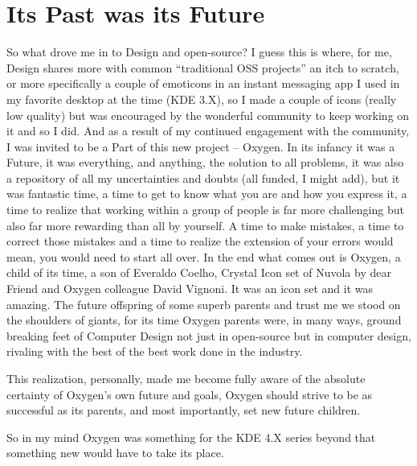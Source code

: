 {\section*{Its Past was its Future}
So what drove me in to Design and open-source? 
I guess this is where, for me, Design shares more with common “traditional OSS projects” an itch to scratch, or more specifically a couple of emoticons in an instant messaging app I used in my favorite desktop at the time (KDE 3.X), so I made a couple of icons (really low quality) but was encouraged by the wonderful community to keep working on it and so I did. And as a result of my continued engagement with the community, I was invited to be a Part of this new project – Oxygen. In its infancy it was a Future, it was everything, and anything, the solution to all problems, it was also a repository of all my uncertainties and doubts (all funded, I might add), but it was fantastic time, a time to get to know what you are and how you express it, a time to realize that working within a group of people is far more challenging but also far more rewarding than all by yourself. A time to make mistakes, a time to correct those mistakes and a time to realize the extension of your errors would mean, you would need to start all over.
In the end what comes out is Oxygen, a child of its time, a son of Everaldo Coelho, Crystal Icon set of Nuvola by dear Friend and Oxygen colleague David Vignoni. It was an icon set and it was amazing.
The future offspring of some superb parents and trust me we stood on the shoulders of giants, for its time Oxygen parents were, in many ways, ground breaking feet of Computer Design not just in open-source but in computer design, rivaling with the best of the best work done in the industry. 

This realization, personally, made me become fully aware of  the absolute certainty of Oxygen's own future and goals, Oxygen should strive to be as successful as its parents, and most importantly, set new future children.

So in my mind Oxygen was something for the KDE 4.X series beyond that something new would have to take its place.  


}
